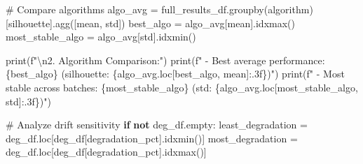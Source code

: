 \documentclass[
  letterpaper,
  DIV=11,
  numbers=noendperiod]{scrartcl}
\newenvironment{Shaded}{\begin{snugshade}}{\end{snugshade}}
\newcommand{\BuiltInTok}[1]{\textcolor[rgb]{0.00,0.23,0.31}{#1}}
\newcommand{\CharTok}[1]{\textcolor[rgb]{0.13,0.47,0.30}{#1}}
\newcommand{\CommentTok}[1]{\textcolor[rgb]{0.37,0.37,0.37}{#1}}
\newcommand{\ControlFlowTok}[1]{\textcolor[rgb]{0.00,0.23,0.31}{\textbf{#1}}}
\newcommand{\KeywordTok}[1]{\textcolor[rgb]{0.00,0.23,0.31}{\textbf{#1}}}
\newcommand{\NormalTok}[1]{\textcolor[rgb]{0.00,0.23,0.31}{#1}}
\newcommand{\OperatorTok}[1]{\textcolor[rgb]{0.37,0.37,0.37}{#1}}
\newcommand{\SpecialCharTok}[1]{\textcolor[rgb]{0.37,0.37,0.37}{#1}}
\newcommand{\SpecialStringTok}[1]{\textcolor[rgb]{0.13,0.47,0.30}{#1}}
\newcommand{\StringTok}[1]{\textcolor[rgb]{0.13,0.47,0.30}{#1}}
\renewenvironment{Shaded}{%
  \begin{tcolorbox}[%
    enhanced,%
    colback=codebg,%
    colframe=codebg,%
    borderline west={3pt}{0pt}{sectionblue},%
    fontupper=\small\ttfamily,%
    boxrule=0pt,%
    arc=0pt,%
    boxsep=5pt,%
    left=2mm,%
    right=2mm,%
    top=2mm,%
    bottom=2mm%
  ]%
}{%
  \end{tcolorbox}%
}
\begin{document}
\begin{Shaded}
\begin{Highlighting}[]
\CommentTok{\# Compare algorithms}
\NormalTok{algo\_avg }\OperatorTok{=}\NormalTok{ full\_results\_df.groupby(}\StringTok{\textquotesingle{}algorithm\textquotesingle{}}\NormalTok{)[}\StringTok{\textquotesingle{}silhouette\textquotesingle{}}\NormalTok{].agg([}\StringTok{\textquotesingle{}mean\textquotesingle{}}\NormalTok{, }\StringTok{\textquotesingle{}std\textquotesingle{}}\NormalTok{])}
\NormalTok{best\_algo }\OperatorTok{=}\NormalTok{ algo\_avg[}\StringTok{\textquotesingle{}mean\textquotesingle{}}\NormalTok{].idxmax()}
\NormalTok{most\_stable\_algo }\OperatorTok{=}\NormalTok{ algo\_avg[}\StringTok{\textquotesingle{}std\textquotesingle{}}\NormalTok{].idxmin()}

\BuiltInTok{print}\NormalTok{(}\SpecialStringTok{f"}\CharTok{\textbackslash{}n}\SpecialStringTok{2. Algorithm Comparison:"}\NormalTok{)}
\BuiltInTok{print}\NormalTok{(}\SpecialStringTok{f"   {-} Best average performance: }\SpecialCharTok{\{}\NormalTok{best\_algo}\SpecialCharTok{\}}\SpecialStringTok{ (silhouette: }\SpecialCharTok{\{}\NormalTok{algo\_avg}\SpecialCharTok{.}\NormalTok{loc[best\_algo, }\StringTok{\textquotesingle{}mean\textquotesingle{}}\NormalTok{]}\SpecialCharTok{:.3f\}}\SpecialStringTok{)"}\NormalTok{)}
\BuiltInTok{print}\NormalTok{(}\SpecialStringTok{f"   {-} Most stable across batches: }\SpecialCharTok{\{}\NormalTok{most\_stable\_algo}\SpecialCharTok{\}}\SpecialStringTok{ (std: }\SpecialCharTok{\{}\NormalTok{algo\_avg}\SpecialCharTok{.}\NormalTok{loc[most\_stable\_algo, }\StringTok{\textquotesingle{}std\textquotesingle{}}\NormalTok{]}\SpecialCharTok{:.3f\}}\SpecialStringTok{)"}\NormalTok{)}

\CommentTok{\# Analyze drift sensitivity}
\ControlFlowTok{if} \KeywordTok{not}\NormalTok{ deg\_df.empty:}
\NormalTok{    least\_degradation }\OperatorTok{=}\NormalTok{ deg\_df.loc[deg\_df[}\StringTok{\textquotesingle{}degradation\_pct\textquotesingle{}}\NormalTok{].idxmin()]}
\NormalTok{    most\_degradation }\OperatorTok{=}\NormalTok{ deg\_df.loc[deg\_df[}\StringTok{\textquotesingle{}degradation\_pct\textquotesingle{}}\NormalTok{].idxmax()]}
    

\end{Highlighting}
\end{Shaded}
\end{document}
